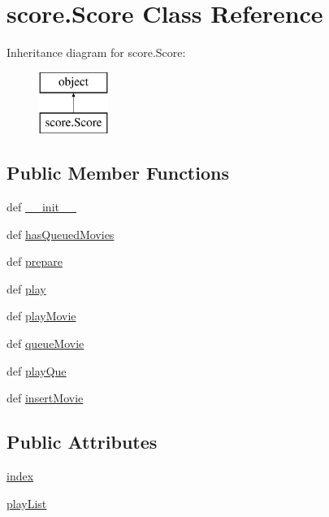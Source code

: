 \hypertarget{classscore_1_1Score}{}\section{score.\+Score Class Reference}
\label{classscore_1_1Score}
Inheritance diagram for score.\+Score\+:\begin{figure}[H]
\begin{center}
\leavevmode
\includegraphics[height=2.000000cm]{classscore_1_1Score}
\end{center}
\end{figure}
\subsection*{Public Member Functions}
\begin{DoxyCompactItemize}
\item 
def \hyperlink{classscore_1_1Score_a532ef0683cfd42bbafae3f879d91842c}{\+\_\+\+\_\+init\+\_\+\+\_\+}
\item 
def \hyperlink{classscore_1_1Score_a2c49cd0ff3eff9c015b48d6c064e6bc3}{has\+Queued\+Movies}
\item 
def \hyperlink{classscore_1_1Score_a2204e055a8ad864375aba2e73485c7f7}{prepare}
\item 
def \hyperlink{classscore_1_1Score_a3f887aaa5c3c3feba8fdfddde51d9b6f}{play}
\item 
def \hyperlink{classscore_1_1Score_a57e50c1a466e4b167e768ccd7e638985}{play\+Movie}
\item 
def \hyperlink{classscore_1_1Score_a003ebe70c48597103b621d67dd9765a0}{queue\+Movie}
\item 
def \hyperlink{classscore_1_1Score_a601a2c920c7d4a44eb0c88ce8705c801}{play\+Que}
\item 
def \hyperlink{classscore_1_1Score_a25006bc097ef949a2675e186c84c1683}{insert\+Movie}
\end{DoxyCompactItemize}
\subsection*{Public Attributes}
\begin{DoxyCompactItemize}
\item 
\hyperlink{classscore_1_1Score_a84516c6907e6ae722b2c683fdbcf457c}{index}
\item 
\hyperlink{classscore_1_1Score_a958a34d11323ba7306760ba1b33c05a1}{play\+List}
\end{DoxyCompactItemize}


